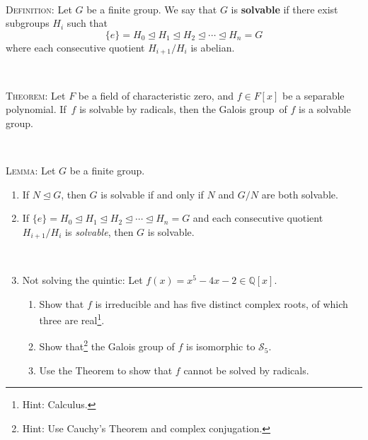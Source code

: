\documentclass[12pt]{amsart}
\newcommand{\Bold}[1]{\contour{black}{#1}}
\newcommand{\Q}{\mathbb{Q}}
\newcommand\itemA{\stepcounter{enumi}\item[{\Bold{(\theenumi)}}]}
\newcommand\itema{\stepcounter{enumii}\item[{\Bold{(\theenumii)}}]}
\begin{document}
	\
	
	
		\begin{framed}
	\textsc{Definition:} Let $G$ be a finite group. We say that $G$ is \textbf{solvable} if there exist subgroups $H_i$ such that \[\{e\} = H_0 \trianglelefteq H_1  \trianglelefteq H_2   \trianglelefteq \cdots  \trianglelefteq H_n = G\] where each consecutive quotient $H_{i+1}/H_i$ is abelian.
	
	
	\
	
		\textsc{Theorem:} Let $F$ be a field of characteristic zero, and $f\in F[x]$ be a separable polynomial. If~$f$ is solvable by radicals, then the Galois group\footnotemark\footnotemark\ of $f$ is a solvable group.
	
	\
	
	
	\textsc{Lemma:} Let $G$ be a finite group. 
	\begin{enumerate}
	\item If $N \trianglelefteq G$, then $G$ is solvable if and only if $N$ and $G/N$ are both solvable.
	\item If $\{e\} = H_0 \trianglelefteq H_1  \trianglelefteq H_2   \trianglelefteq \cdots  \trianglelefteq H_n = G$ and each consecutive quotient $H_{i+1}/H_i$ is \emph{solvable}, then $G$ is solvable.
	\end{enumerate}
		\end{framed}
		
		\
		
			\begin{enumerate}\setcounter{enumi}{2}
		
		\itemA Not solving the quintic: Let $f(x) = x^5 - 4x -2 \in \Q[x]$.
		\begin{enumerate}
		\itema Show that $f$ is irreducible and has five distinct complex roots, of which three are real\footnote{Hint: Calculus.}.
		\itema Show that\footnote{Hint: Use Cauchy's Theorem and complex conjugation.} the Galois group of $f$ is isomorphic to $\mathcal{S}_5$.
		\itema Use the Theorem to show that $f$ cannot be solved by radicals.
		\end{enumerate}
				\end{enumerate}
\end{document}

